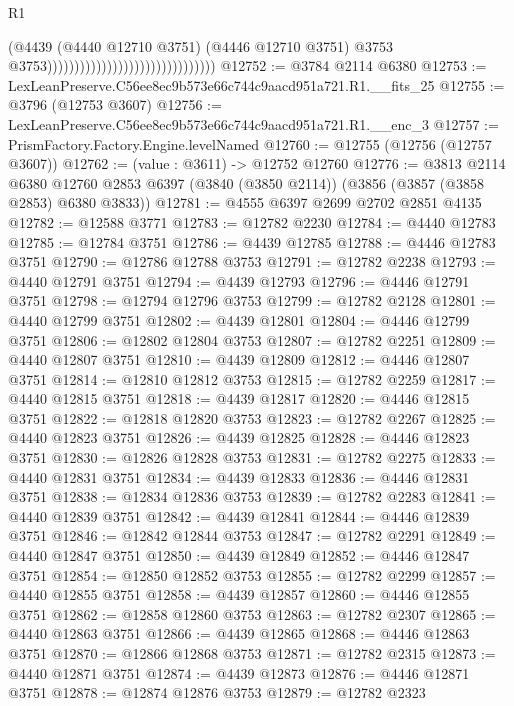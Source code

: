 \begin{lexlean}{R1}
\begin{coremodule}
                                                                (@4439
                                                                  (@4440 @12710 @3751)
                                                                  (@4446 @12710 @3751)
                                                                  @3753
                                                                  @3753)))))))))))))))))))))))))))))))
@12752 := @3784 @2114 @6380
@12753 := LexLeanPreserve.C56ee8ec9b573e66c744c9aacd951a721.R1.__fits_25
@12755 := @3796 (@12753 @3607)
@12756 := LexLeanPreserve.C56ee8ec9b573e66c744c9aacd951a721.R1.__enc_3
@12757 := PrismFactory.Factory.Engine.levelNamed
@12760 := @12755 (@12756 (@12757 @3607))
@12762 := (value : @3611) -> @12752 @12760
@12776 := @3813
    @2114
    @6380
    @12760
    @2853
    @6397
    (@3840 (@3850 @2114))
    (@3856 (@3857 (@3858 @2853) @6380 @3833))
@12781 := @4555 @6397 @2699 @2702 @2851 @4135
@12782 := @12588 @3771
@12783 := @12782 @2230
@12784 := @4440 @12783
@12785 := @12784 @3751
@12786 := @4439 @12785
@12788 := @4446 @12783 @3751
@12790 := @12786 @12788 @3753
@12791 := @12782 @2238
@12793 := @4440 @12791 @3751
@12794 := @4439 @12793
@12796 := @4446 @12791 @3751
@12798 := @12794 @12796 @3753
@12799 := @12782 @2128
@12801 := @4440 @12799 @3751
@12802 := @4439 @12801
@12804 := @4446 @12799 @3751
@12806 := @12802 @12804 @3753
@12807 := @12782 @2251
@12809 := @4440 @12807 @3751
@12810 := @4439 @12809
@12812 := @4446 @12807 @3751
@12814 := @12810 @12812 @3753
@12815 := @12782 @2259
@12817 := @4440 @12815 @3751
@12818 := @4439 @12817
@12820 := @4446 @12815 @3751
@12822 := @12818 @12820 @3753
@12823 := @12782 @2267
@12825 := @4440 @12823 @3751
@12826 := @4439 @12825
@12828 := @4446 @12823 @3751
@12830 := @12826 @12828 @3753
@12831 := @12782 @2275
@12833 := @4440 @12831 @3751
@12834 := @4439 @12833
@12836 := @4446 @12831 @3751
@12838 := @12834 @12836 @3753
@12839 := @12782 @2283
@12841 := @4440 @12839 @3751
@12842 := @4439 @12841
@12844 := @4446 @12839 @3751
@12846 := @12842 @12844 @3753
@12847 := @12782 @2291
@12849 := @4440 @12847 @3751
@12850 := @4439 @12849
@12852 := @4446 @12847 @3751
@12854 := @12850 @12852 @3753
@12855 := @12782 @2299
@12857 := @4440 @12855 @3751
@12858 := @4439 @12857
@12860 := @4446 @12855 @3751
@12862 := @12858 @12860 @3753
@12863 := @12782 @2307
@12865 := @4440 @12863 @3751
@12866 := @4439 @12865
@12868 := @4446 @12863 @3751
@12870 := @12866 @12868 @3753
@12871 := @12782 @2315
@12873 := @4440 @12871 @3751
@12874 := @4439 @12873
@12876 := @4446 @12871 @3751
@12878 := @12874 @12876 @3753
@12879 := @12782 @2323

\end{coremodule}
\end{lexlean}
